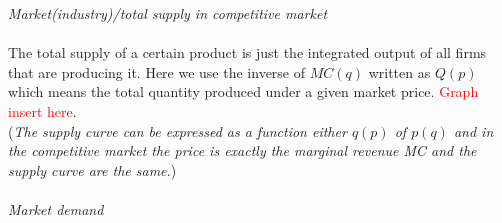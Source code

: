 \documentclass[10pt]{article}
\newenvironment{changemargin}[2]{%
  \begin{list}{}{%
    \setlength{\topsep}{0pt}%
    \setlength{\leftmargin}{#1}%
    \setlength{\rightmargin}{#2}%
    \setlength{\listparindent}{\parindent}%
    \setlength{\itemindent}{\parindent}%
    \setlength{\parsep}{\parskip}%
  }%
  \item[]}{\end{list}}
\begin{document}
\begin{changemargin}{-0.125in}{0in}
\begin{enumerate}
\begin{enumerate}
        \textit{Market(industry)/total supply in competitive market}
        \\
        \\
        The total supply of a certain product is just the integrated output of all firms that are producing it. Here we use the inverse of $MC(q)$ written as $Q(p)$ which means the total quantity produced under a given market price. \textcolor{red}{Graph insert here}.
        \\
        (\textit{The supply curve can be expressed as a function either $q(p)$ of $p(q)$ and in the competitive market the price is exactly the marginal revenue MC and the supply curve are the same.})
        \\
        \\
        \textit{Market demand}
        
        \bigskip
        

\end{enumerate}
\end{enumerate}
\end{changemargin}
\end{document}
